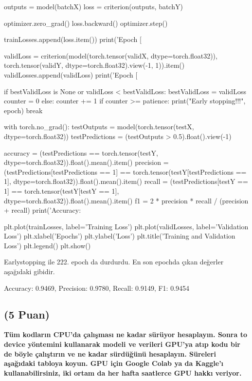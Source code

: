 \documentclass[11pt]{article}
\begin{document}
\begin{python}
        outputs = model(batchX)
        loss = criterion(outputs, batchY)
        
        optimizer.zero_grad()
        loss.backward()
        optimizer.step()
        
    trainLosses.append(loss.item())
    print('Epoch [%
    
    validLoss = criterion(model(torch.tensor(validX, dtype=torch.float32)), torch.tensor(validY, dtype=torch.float32).view(-1, 1)).item()
    validLosses.append(validLoss)
    print('Epoch [%

    if bestValidLoss is None or  validLoss < bestValidLoss:
        bestValidLoss = validLoss
        counter = 0
    else:
        counter += 1
        if counter >= patience:
            print("Early stopping!!!", epoch)
            break

    with torch.no_grad():
        testOutputs = model(torch.tensor(testX, dtype=torch.float32))
        testPredictions = (testOutputs > 0.5).float().view(-1)

        
        accuracy = (testPredictions == torch.tensor(testY, dtype=torch.float32)).float().mean().item()
        precision = (testPredictions[testPredictions == 1] == torch.tensor(testY[testPredictions == 1], dtype=torch.float32)).float().mean().item()
        recall = (testPredictions[testY == 1] == torch.tensor(testY[testY == 1], dtype=torch.float32)).float().mean().item()
        f1 = 2 * precision * recall / (precision + recall)
        print('Accuracy: %

plt.plot(trainLosses, label='Training Loss')
plt.plot(validLosses, label='Validation Loss')
plt.xlabel('Epochs')
plt.ylabel('Loss')
plt.title('Training and Validation Loss')
plt.legend()
plt.show()
\end{python}

Earlystopping ile 222. epoch da durdurdu. En son epochda  çıkan değerler  aşağıdaki gibidir.

Accuracy: 0.9469, Precision: 0.9780, Recall: 0.9149, F1: 0.9454

\subsection{(5 Puan)} \textbf{Tüm kodların CPU'da çalışması ne kadar sürüyor hesaplayın. Sonra to device yöntemini kullanarak modeli ve verileri GPU'ya atıp kodu bir de böyle çalıştırın ve ne kadar sürdüğünü hesaplayın. Süreleri aşağıdaki tabloya koyun. GPU için Google Colab ya da Kaggle'ı kullanabilirsiniz, iki ortam da her hafta saatlerce GPU hakkı veriyor.}
\end{document}
